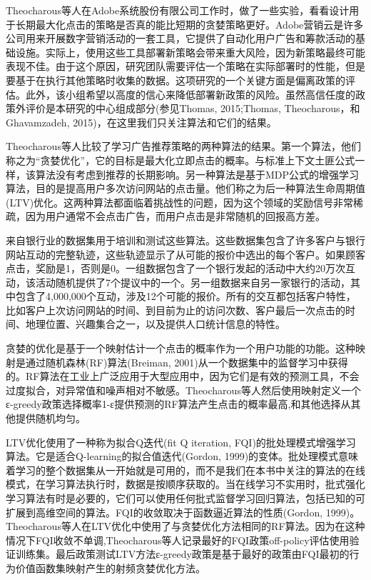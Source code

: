 Theocharous等人在Adobe系统股份有限公司工作时，做了一些实验，看看设计用于长期最大化点击的策略是否真的能比短期的贪婪策略更好。Adobe营销云是许多公司用来开展数字营销活动的一套工具，它提供了自动化用户广告和筹款活动的基础设施。实际上，使用这些工具部署新策略会带来重大风险，因为新策略最终可能表现不佳。由于这个原因，研究团队需要评估一个策略在实际部署时的性能，但是要基于在执行其他策略时收集的数据。这项研究的一个关键方面是偏离政策的评估。此外，该小组希望以高度的信心来降低部署新政策的风险。虽然高信任度的政策外评价是本研究的中心组成部分(参见Thomas, 2015;Thomas, Theocharous，和Ghavamzadeh, 2015)，在这里我们只关注算法和它们的结果。

Theocharous等人比较了学习广告推荐策略的两种算法的结果。第一个算法，他们称之为“贪婪优化”，它的目标是最大化立即点击的概率。与标准上下文土匪公式一样，该算法没有考虑到推荐的长期影响。另一种算法是基于MDP公式的增强学习算法，目的是提高用户多次访问网站的点击量。他们称之为后一种算法生命周期值(LTV)优化。这两种算法都面临着挑战性的问题，因为这个领域的奖励信号非常稀疏，因为用户通常不会点击广告，而用户点击是非常随机的回报高方差。

来自银行业的数据集用于培训和测试这些算法。这些数据集包含了许多客户与银行网站互动的完整轨迹，这些轨迹显示了从可能的报价中选出的每个客户。如果顾客点击，奖励是1，否则是0。一组数据包含了一个银行发起的活动中大约20万次互动，该活动随机提供了7个提议中的一个。另一组数据来自另一家银行的活动，其中包含了4,000,000个互动，涉及12个可能的报价。所有的交互都包括客户特性，比如客户上次访问网站的时间、到目前为止的访问次数、客户最后一次点击的时间、地理位置、兴趣集合之一，以及提供人口统计信息的特性。

贪婪的优化是基于一个映射估计一个点击的概率作为一个用户功能的功能。这种映射是通过随机森林(RF)算法(Breiman, 2001)从一个数据集中的监督学习中获得的。RF算法在工业上广泛应用于大型应用中，因为它们是有效的预测工具，不会过度拟合，对异常值和噪声相对不敏感。Theocharous等人然后使用映射定义一个ε-greedy政策选择概率1-ε提供预测的RF算法产生点击的概率最高,和其他选择从其他提供随机均匀。

LTV优化使用了一种称为拟合Q迭代(fit Q iteration, FQI)的批处理模式增强学习算法。它是适合Q-learning的拟合值迭代(Gordon, 1999)的变体。批处理模式意味着学习的整个数据集从一开始就是可用的，而不是我们在本书中关注的算法的在线模式，在学习算法执行时，数据是按顺序获取的。当在线学习不实用时，批式强化学习算法有时是必要的，它们可以使用任何批式监督学习回归算法，包括已知的可扩展到高维空间的算法。FQI的收敛取决于函数逼近算法的性质(Gordon, 1999)。Theocharous等人在LTV优化中使用了与贪婪优化方法相同的RF算法。因为在这种情况下FQI收敛不单调,Theocharous等人记录最好的FQI政策off-policy评估使用验证训练集。最后政策测试LTV方法ε-greedy政策是基于最好的政策由FQI最初的行为价值函数集映射产生的射频贪婪优化方法。

